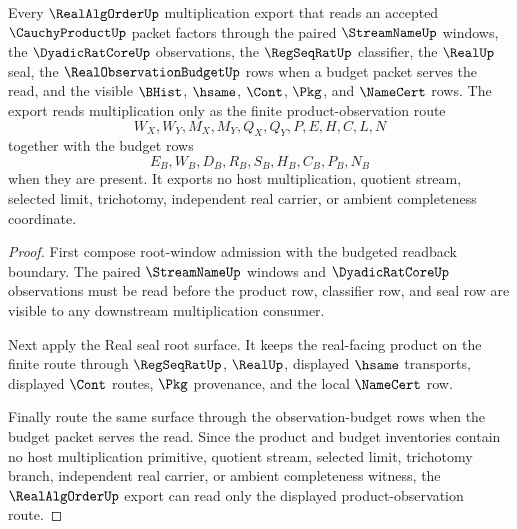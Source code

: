 \begin{theorem}
\label{thm:cauchy-product-realalgorder-product-observation-export}
Every $\RealAlgOrderUp$ multiplication export that reads an accepted $\CauchyProductUp$ packet factors through the paired $\StreamNameUp$ windows, the $\DyadicRatCoreUp$ observations, the $\RegSeqRatUp$ classifier, the $\RealUp$ seal, the $\RealObservationBudgetUp$ rows when a budget packet serves the read, and the visible $\BHist$, $\hsame$, $\Cont$, $\Pkg$, and $\NameCert$ rows. The export reads multiplication only as the finite product-observation route
$$
W_X,W_Y,M_X,M_Y,Q_X,Q_Y,P,E,H,C,L,N
$$
together with the budget rows
$$
E_B,W_B,D_B,R_B,S_B,H_B,C_B,P_B,N_B
$$
when they are present. It exports no host multiplication, quotient stream, selected limit, trichotomy, independent real carrier, or ambient completeness coordinate.
\end{theorem}
\begin{proof}
First compose root-window admission with the budgeted readback boundary. The paired $\StreamNameUp$ windows and $\DyadicRatCoreUp$ observations must be read before the product row, classifier row, and seal row are visible to any downstream multiplication consumer.

Next apply the Real seal root surface. It keeps the real-facing product on the finite route through $\RegSeqRatUp$, $\RealUp$, displayed $\hsame$ transports, displayed $\Cont$ routes, $\Pkg$ provenance, and the local $\NameCert$ row.

Finally route the same surface through the observation-budget rows when the budget packet serves the read. Since the product and budget inventories contain no host multiplication primitive, quotient stream, selected limit, trichotomy branch, independent real carrier, or ambient completeness witness, the $\RealAlgOrderUp$ export can read only the displayed product-observation route.
\end{proof}

